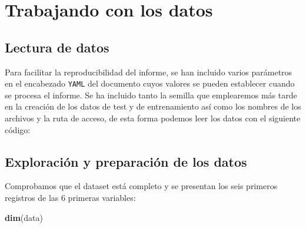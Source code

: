 \documentclass[
]{article}
\newenvironment{Shaded}{\begin{snugshade}}{\end{snugshade}}
\newcommand{\CommentTok}[1]{\textcolor[rgb]{0.56,0.35,0.01}{\textit{#1}}}
\newcommand{\DataTypeTok}[1]{\textcolor[rgb]{0.13,0.29,0.53}{#1}}
\newcommand{\KeywordTok}[1]{\textcolor[rgb]{0.13,0.29,0.53}{\textbf{#1}}}
\newcommand{\NormalTok}[1]{#1}
\newcommand{\OperatorTok}[1]{\textcolor[rgb]{0.81,0.36,0.00}{\textbf{#1}}}
\newcommand{\StringTok}[1]{\textcolor[rgb]{0.31,0.60,0.02}{#1}}
\begin{document}
\hypertarget{trabajando-con-los-datos}{%
\section{Trabajando con los datos}\label{trabajando-con-los-datos}}

\hypertarget{lectura-de-datos}{%
\subsection{Lectura de datos}\label{lectura-de-datos}}

Para facilitar la reproducibilidad del informe, se han incluido varios
parámetros en el encabezado \texttt{YAML} del documento cuyos valores se
pueden establecer cuando se procesa el informe. Se ha incluido tanto la
semilla que emplearemos más tarde en la creación de los datos de test y
de entrenamiento así como los nombres de los archivos y la ruta de
acceso, de esta forma podemos leer los datos con el siguiente código:

\begin{Shaded}
\end{Shaded}

\hypertarget{exploraciuxf3n-y-preparaciuxf3n-de-los-datos}{%
\subsection{Exploración y preparación de los
datos}\label{exploraciuxf3n-y-preparaciuxf3n-de-los-datos}}

Comprobamos que el dataset está completo y se presentan los seis
primeros registros de las 6 primeras variables:

\begin{Shaded}
\begin{Highlighting}[]
\KeywordTok{dim}\NormalTok{(data)}
\end{Highlighting}
\end{Shaded}
\end{document}
